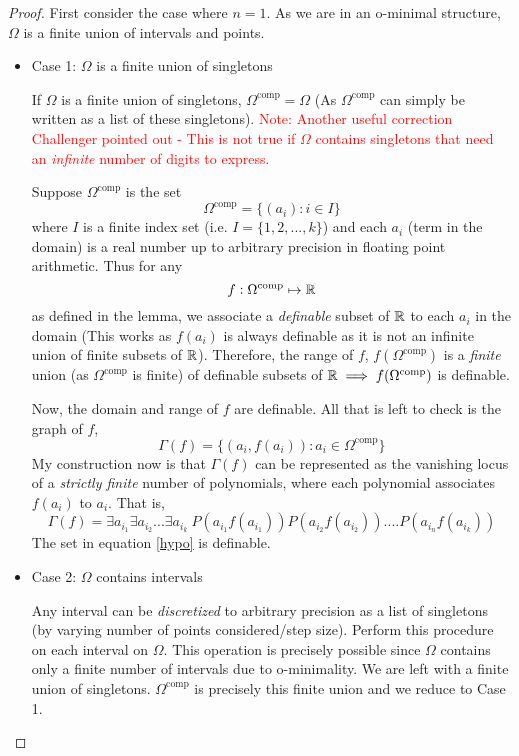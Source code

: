 \begin{proof}
    First consider the case where $n = 1$. As we are in an o-minimal structure, $\Omega$ is a finite union of intervals and points.
    \begin{itemize}
        \item Case 1: $\Omega$ is a finite union of singletons

        If $\Omega$ is a finite union of singletons, $\Omega^\text{comp} = \Omega$ (As $\Omega^\text{comp}$ can simply be written as a list of these singletons). 
        \textcolor{red}{Note: Another useful correction Challenger pointed out - This is not true if $\Omega$ contains singletons that need an \textit{infinite} number of digits to express.}
        
        Suppose $\Omega^\text{comp}$ is the set
        \begin{equation*}
            \Omega^\text{comp} = \{(a_i) : i\in I\} 
        \end{equation*}
        where $I$ is a finite index set (i.e. $I = \{1, 2, ..., k\}$) and each $a_i$ (term in the domain) is a real number up to arbitrary precision in floating point arithmetic.
        Thus for any
        \begin{equation*}
            f:\Omega^\text{comp}\mapsto\mathbb{R}
        \end{equation*}
        as defined in the lemma, we associate a \textit{definable} subset of $\mathbb{R}$ to each $a_i$ in the domain (This works as $f(a_i)$ is always definable as it is not an infinite union of finite subsets of $\mathbb{R}$). Therefore, the range of $f$, $f(\Omega^\text{comp})$ is a \textit{finite} union (as $\Omega^\text{comp}$ is finite) of definable subsets of $\mathbb{R}\implies f(\Omega^\text{comp})$ is definable.
        \par Now, the domain and range of $f$ are definable. All that is left to check is the graph of $f$,
        \begin{equation*}
            \Gamma(f) = \{(a_i, f(a_i)): a_i\in\Omega^\text{comp}\}
        \end{equation*}
        My construction now is that $\Gamma(f)$ can be represented as the vanishing locus of a \textit{strictly finite} number of polynomials, where each polynomial associates $f(a_i)$ to $a_i$. That is,
        \begin{equation}
        \label{hypo}
            \Gamma(f) = \exists a_{i_1}\exists a_{i_2}...\exists a_{i_k}\: P(a_{i_1}f(a_{i_1}))P(a_{i_2}f(a_{i_2}))....P(a_{i_n}f(a_{i_k}))
        \end{equation}
        The set in equation \ref{hypo} is definable.
        \item Case 2: $\Omega$ contains intervals

        Any interval can be \textit{discretized} to arbitrary precision as a list of singletons (by varying number of points considered/step size). Perform this procedure on each interval on $\Omega$. This operation is precisely possible since $\Omega$ contains only a finite number of intervals due to o-minimality. We are left with a finite union of singletons. $\Omega^\text{comp}$ is precisely this finite union and we reduce to Case 1.
    \end{itemize}
\end{proof}
